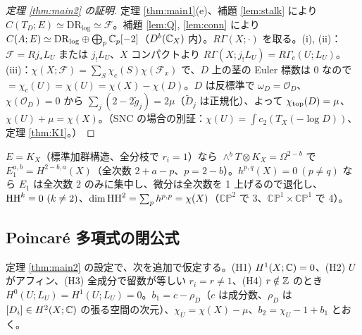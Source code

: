 \begin{proof}[定理 \ref{thm:main2} の証明]
定理 \ref{thm:main1}(e)、補題 \ref{lem:stalk} により $C(T_D;E)\simeq\mathrm{DR}_{\log}\simeq\mathcal F$。補題 \ref{lem:Q}, \ref{lem:conn} により $C(A;E)\simeq\mathrm{DR}_{\log}\oplus\bigoplus_p\mathbb C_p[-2]$（$D^b(\mathbb C_X)$ 内）。$R\Gamma(X;\cdot)$ を取る。(i), (ii)：$\mathcal F=Rj_*L_U$ または $j_!L_U$、$X$ コンパクトより $R\Gamma(X;j_!L_U)=R\Gamma_c(U;L_U)$。(iii)：$\chi(X;\mathcal F)=\sum_S\chi_c(S)\chi(\mathcal F_x)$ で、$D$ 上の茎の Euler 標数は 0 なので $=\chi_c(U)=\chi(U)=\chi(X)-\chi(D)$。$D$ は反標準で $\omega_D=\mathcal O_D$、$\chi(\mathcal O_D)=0$ から $\sum_j(2-2\tilde g_j)=2\mu$（$\tilde D_j$ は正規化）、よって $\chi_{\rm top}(D)=\mu$、$\chi(U)+\mu=\chi(X)$。（SNC の場合の別証：$\chi(U)=\int c_2(T_X(-\log D))$、定理 \ref{thm:K1}。）\qedhere
\end{proof}

\begin{prop}[$r_i=1$：$E=K_X$]\tP\label{prop:KX}
$E=K_X$（標準加群構造、全分枝で $r_i=1$）なら $\wedge^bT\otimes K_X=\Omega^{2-b}$ で $E_1^{a,b}=H^{2-b,a}(X)$（全次数 $2+a-p$、$p=2-b$）。$h^{p,q}(X)=0\ (p\ne q)$ なら $E_1$ は全次数 2 のみに集中し、微分は全次数を 1 上げるので退化し、$\mathrm{HH}^k=0\ (k\ne2)$、$\dim\mathrm{HH}^2=\sum_ph^{p,p}=\chi(X)$（$\mathbb{CP}^2$ で 3、$\mathbb{CP}^1\times\mathbb{CP}^1$ で 4）。
\end{prop}

\subsection{Poincar\'e 多項式の閉公式}
定理 \ref{thm:main2} の設定で、次を追加で仮定する。(H1) $H^1(X;\mathbb C)=0$、(H2) $U$ がアフィン、(H3) 全成分で留数が等しい $r_i=r\ne1$、(H4) $r\notin\mathbb Z$ のとき $H^0(U;L_U)=H^1(U;L_U)=0$。$b_1=c-\rho_D$（$c$ は成分数、$\rho_D$ は $[D_i]\in H^2(X;\mathbb C)$ の張る空間の次元）、$\chi_U=\chi(X)-\mu$、$b_2=\chi_U-1+b_1$ とおく。

